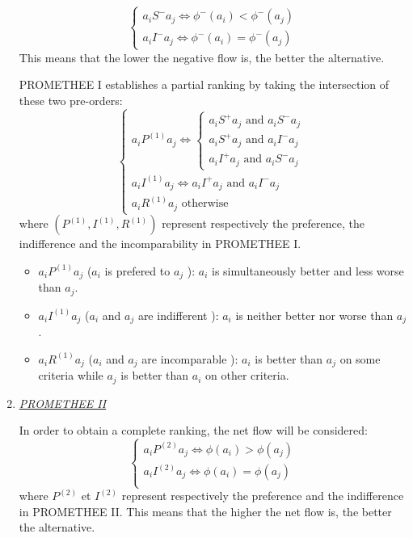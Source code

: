 \begin{enumerate}
\begin{equation}
\begin{cases}
a_iS^{-}a_j \Leftrightarrow \phi^{-}(a_i) < \phi^{-}(a_j)\\
a_iI^{-}a_j \Leftrightarrow \phi^{-}(a_i) = \phi^{-}(a_j)
\end{cases}
\end{equation}
This means that the lower the negative flow is, the better the alternative.

PROMETHEE I establishes a partial ranking by taking the intersection of these two pre-orders:
\begin{equation}
\begin{cases}
a_iP^{(1)}a_j \Leftrightarrow \begin{cases}
	a_iS^{+}a_j \text{ and } a_iS^{-}a_j\\
	a_iS^{+}a_j \text{ and } a_iI^{-}a_j\\
	a_iI^{+}a_j \text{ and } a_iS^{-}a_j
	\end{cases}\\
a_iI^{(1)}a_j \Leftrightarrow a_iI^{+}a_j \text{ and } a_iI^{-}a_j\\
a_iR^{(1)}a_j \text{ otherwise}
\end{cases}
\end{equation}
where $(P^{(1)}, I^{(1)}, R^{(1)})$ represent respectively the preference, the indifference and the incomparability in PROMETHEE I.
\begin{itemize}
\item $a_iP^{(1)}a_j$ (\og $a_i$ is prefered to $a_j$ \fg): $a_i$ is simultaneously better and less worse than $a_j$.
\item $a_iI^{(1)}a_j$ (\og $a_i$ and $a_j$ are indifferent \fg): $a_i$ is neither better nor worse than $a_j$.
\item $a_iR^{(1)}a_j$ (\og $a_i$ and $a_j$ are incomparable \fg): $a_i$ is better than $a_j$ on some criteria while $a_j$ is better than $a_i$ on other criteria.
\end{itemize}

\item \textit{\underline{PROMETHEE II}}

In order to obtain a complete ranking, the net flow will be considered:
\begin{equation}
\begin{cases}
a_iP^{(2)}a_j \Leftrightarrow \phi(a_i) > \phi(a_j)\\
a_iI^{(2)}a_j \Leftrightarrow \phi(a_i) = \phi(a_j)\\
\end{cases}
\end{equation}
where $P^{(2)}$ et $I^{(2)}$ represent respectively the preference and the indifference in PROMETHEE II. This means that the higher the net flow is, the better the alternative.


\end{enumerate}

